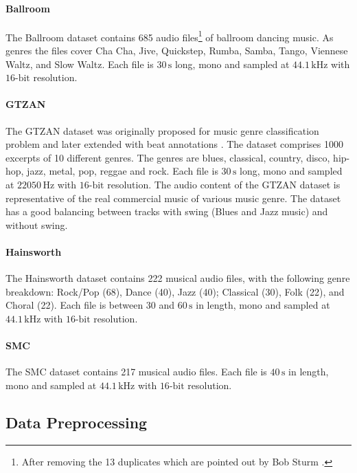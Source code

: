 \documentclass{scrartcl}
\begin{document}
\paragraph{Ballroom} 
The Ballroom dataset \cite{Gouyon2006b, Krebs2013} contains 685 audio files\footnote{After removing the 13 duplicates which are pointed out by Bob Sturm \cite{Sturm2014}.} of ballroom dancing music. As genres the files cover Cha Cha, Jive, Quickstep, Rumba, Samba, Tango, Viennese Waltz, and Slow Waltz. Each file is $30\,\text{s}$ long, mono and sampled at $44.1\,\text{kHz}$ with $16\text{-bit}$ resolution.

\paragraph{GTZAN} 
The GTZAN \cite{Tzanetakis2002b} dataset was originally proposed for music genre classification problem and later extended with beat annotations \cite{marchand2015swing}. The dataset comprises 1000 excerpts of 10 different genres. The genres are blues, classical, country, disco, hip-hop, jazz, metal, pop, reggae and rock. Each file is $30\,\text{s}$ long, mono and sampled at $22050\,\text{Hz}$ with $16\text{-bit}$ resolution. The audio content of the GTZAN dataset is representative of the real commercial music of various music genre. The dataset has a good balancing between tracks with swing (Blues and Jazz music) and without swing.

\paragraph{Hainsworth} 
The Hainsworth dataset \cite{Hainsworth2004} contains 222 musical audio files, with the following genre breakdown: Rock/Pop (68), Dance (40), Jazz (40); Classical (30), Folk (22), and Choral (22). Each file is between $30$ and $60\,\text{s}$ in length, mono and sampled at $44.1\,\text{kHz}$ with $16\text{-bit}$ resolution.

\paragraph{SMC}
The SMC dataset \cite{Holzapfel2012} contains 217 musical audio files. Each file is $40 \,\text{s}$ in length, mono and sampled at $44.1\,\text{kHz}$ with $16\text{-bit}$ resolution.


\subsection{Data Preprocessing}
\end{document}
